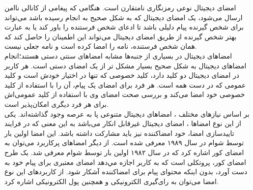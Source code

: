 \documentclass[12pt,a4paper]{book}
\begin{document}
امضای دیجیتال نوعی رمزنگاری نامتقارن است. هنگامی که پیغامی از کانالی ناامن ارسال می‌شود، یک امضای دیجیتال که به شکل صحیح به انجام رسیده باشد می‌تواند برای شخص گیرنده پیام دلیلی باشد تا ادعای شخص فرستنده را باور کند یا به عبارت بهتر شخص گیرنده از طریق امضای دیجیتال می‌تواند این اطمینان را حاصل کند که همان شخص فرستنده، نامه را امضا کرده است و نامه جعلی نیست.
\\
امضاهای دیجیتال در بسیاری از جنبه‌ها مشابه امضاهای سنتی دستی هستند؛انجام امضاهای دیجیتال به شکل صحیح بسیار مشکل تر از یک امضای دستی است. هر کاربر در امضای دیجیتال دو کلید دارد، کلید خصوصی که تنها در اختیار خودش است و کلید عمومی که در دست همه است. هر فرد برای امضای یک پیام، آن را با استفاده از کلید خصوصی خود امضا می‌کند و بررسی صحت امضای وی با استفاده از کلید عمومی‌اش برای هر فرد دیگری امکان‌پذیر است.
\\
بر اساس نیازهای  مختلف ، امضاهای دیجیتال متنوعی پا به عرصه وجود گذاشته‌اند. یکی از این نوع امضاها ، امضای  دیجیتال غیرقابل انکار می‌باشد به این معنی که در فرایند تاییدسازی امضا، خود امضاکننده نیز باید مشارکت داشته باشد. این امضا اولین بار توسط شوام در سال
۱۹۸۹
معرفی شده است.
از دیگر امضاهای پرکاربرد می‌توان به امضای کور اشاره کرد که در سال 
۱۹۸۲
اولین بار توسط شوام معرفی شد. یک طرح امضای کور، پروتکلی است که به کاربر اجازه مي‌دهد امضای معتبری برای پیام خود به دست آورد، بدون اینکه محتوای پیام برای امضاکننده آشکار شود. از کاربردهای این نوع امضا می‌توان به رای‌گیری الکترونیکی و همچنین پول الکترونیکی اشاره کرد.


	
	
%
%
	
	
\end{document}
